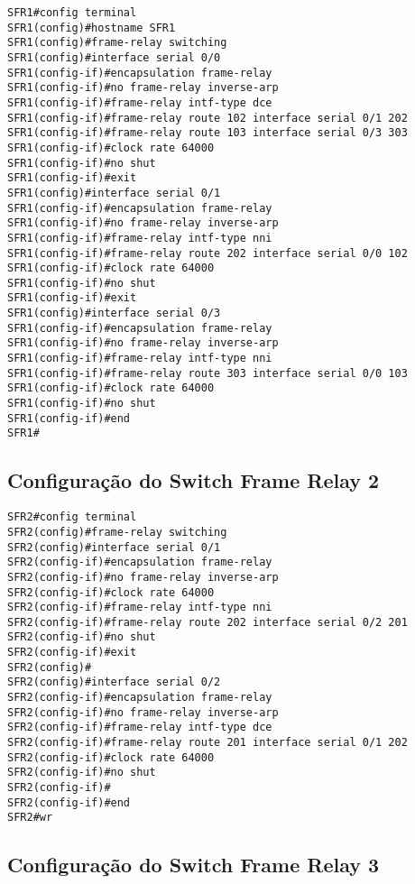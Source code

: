 \documentclass[]{article}
\begin{document}
\begin{verbatim}
SFR1#config terminal
SFR1(config)#hostname SFR1
SFR1(config)#frame-relay switching
SFR1(config)#interface serial 0/0
SFR1(config-if)#encapsulation frame-relay
SFR1(config-if)#no frame-relay inverse-arp
SFR1(config-if)#frame-relay intf-type dce
SFR1(config-if)#frame-relay route 102 interface serial 0/1 202
SFR1(config-if)#frame-relay route 103 interface serial 0/3 303
SFR1(config-if)#clock rate 64000
SFR1(config-if)#no shut
SFR1(config-if)#exit
SFR1(config)#interface serial 0/1
SFR1(config-if)#encapsulation frame-relay
SFR1(config-if)#no frame-relay inverse-arp
SFR1(config-if)#frame-relay intf-type nni
SFR1(config-if)#frame-relay route 202 interface serial 0/0 102
SFR1(config-if)#clock rate 64000
SFR1(config-if)#no shut
SFR1(config-if)#exit
SFR1(config)#interface serial 0/3
SFR1(config-if)#encapsulation frame-relay
SFR1(config-if)#no frame-relay inverse-arp
SFR1(config-if)#frame-relay intf-type nni
SFR1(config-if)#frame-relay route 303 interface serial 0/0 103
SFR1(config-if)#clock rate 64000
SFR1(config-if)#no shut
SFR1(config-if)#end
SFR1#
\end{verbatim}

\hypertarget{configurauxe7uxe3o-do-switch-frame-relay-2}{%
\subsection{Configuração do Switch Frame Relay
2}\label{configurauxe7uxe3o-do-switch-frame-relay-2}}

\begin{verbatim}
SFR2#config terminal
SFR2(config)#frame-relay switching
SFR2(config)#interface serial 0/1
SFR2(config-if)#encapsulation frame-relay
SFR2(config-if)#no frame-relay inverse-arp
SFR2(config-if)#clock rate 64000
SFR2(config-if)#frame-relay intf-type nni
SFR2(config-if)#frame-relay route 202 interface serial 0/2 201
SFR2(config-if)#no shut
SFR2(config-if)#exit
SFR2(config)#
SFR2(config)#interface serial 0/2
SFR2(config-if)#encapsulation frame-relay
SFR2(config-if)#no frame-relay inverse-arp
SFR2(config-if)#frame-relay intf-type dce
SFR2(config-if)#frame-relay route 201 interface serial 0/1 202
SFR2(config-if)#clock rate 64000
SFR2(config-if)#no shut
SFR2(config-if)#
SFR2(config-if)#end
SFR2#wr
\end{verbatim}

\hypertarget{configurauxe7uxe3o-do-switch-frame-relay-3}{%
\subsection{Configuração do Switch Frame Relay
3}\label{configurauxe7uxe3o-do-switch-frame-relay-3}}
\end{document}
